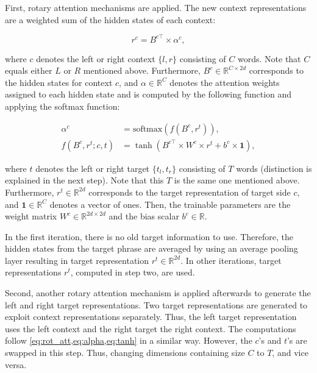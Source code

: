 \documentclass[american, oneside]{ecsgdp}
\begin{document}
First, rotary attention mechanisms are applied. The new context representations are a weighted sum of the hidden states of each context: 

\begin{equation}
    r^c = B^{c\top} \times \alpha^c, \label{eq:rot_att}
\end{equation}

\noindent where $c$ denotes the left or right context $\{l, r\}$ consisting of $C$ words. Note that $C$ equals either $L$ or $R$ mentioned above. Furthermore, $B^c \in \mathbb{R}^{C \times 2d}$ corresponds to the hidden states for context $c$, and $\alpha \in \mathbb{R}^{C}$ denotes the attention weights assigned to each hidden state and is computed by the following function and applying the softmax function:

\begin{align}
    \alpha^c                         & = \text{softmax}\left( f \left( B^c, r^t\right) \right), \label{eq:alpha}\\
    f \left( B^c, r^t; c, t \right) & = \tanh{\left( B^{c\top} \times W^c \times r^t + b^c \times \mathbf{1} \right)}, \label{eq:tanh}
\end{align}

\noindent where $t$ denotes the left or right target $\{t_l, t_r\}$ consisting of $T$ words (distinction is explained in the next step). Note that this $T$ is the same one mentioned above. Furthermore, $r^t \in \mathbb{R}^{2d}$ corresponds to the target representation of target side $c$, and $\mathbf{1} \in \mathbb{R}^{C}$ denotes a vector of ones. Then, the trainable parameters are the weight matrix $W^c \in \mathbb{R}^{2d \times 2d}$ and the bias scalar $b^c \in \mathbb{R}$.

In the first iteration, there is no old target information to use. Therefore, the hidden states from the target phrase are averaged by using an average pooling layer resulting in target representation $r^t \in \mathbb{R}^{2d}$. In other iterations, target representations $r^t$, computed in step two, are used.

Second, another rotary attention mechanism is applied afterwards to generate the left and right target representations. Two target representations are generated to exploit context representations separately. Thus, the left target representation uses the left context and the right target the right context. The computations follow \cref{eq:rot_att,eq:alpha,eq:tanh} in a similar way. However, the $c$'s and $t$'s are swapped in this step. Thus, changing dimensions containing size $C$ to $T$, and vice versa.
\end{document}
